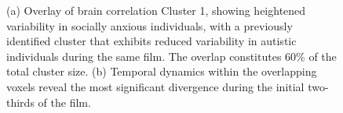 \begin{figure}[!ht]
	\centering
	\caption{(a) Overlay of brain correlation Cluster 1, showing heightened variability in socially anxious individuals, with a previously identified cluster that exhibits reduced variability in autistic individuals during the same film. The overlap constitutes 60\% of the total cluster size. (b) Temporal dynamics within the overlapping voxels reveal the most significant divergence during the initial two-thirds of the film.}
    \vspace*{-10pt}
	\label{fig:isc-asc-sa}
\end{figure}


